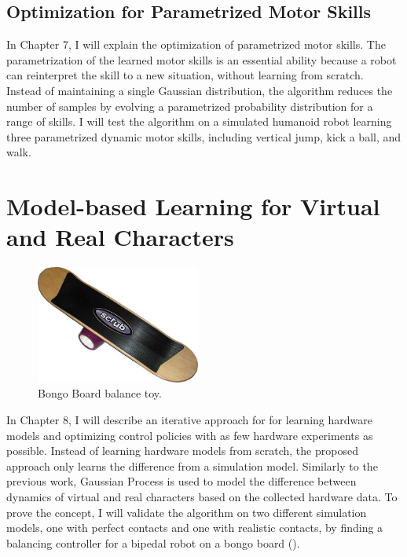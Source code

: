\subsection{Optimization for Parametrized Motor Skills}
In Chapter 7, I will explain the optimization of parametrized motor skills.
The parametrization of the learned motor skills is an essential ability
because a robot can reinterpret the skill to a new situation, without
learning from scratch.
Instead of maintaining a single Gaussian distribution, 
the algorithm reduces the number of samples by evolving a parametrized
probability distribution for a range of skills.
I will test the algorithm on a simulated humanoid
robot learning three parametrized dynamic motor skills, 
including vertical jump, kick a ball, and walk.

\section{Model-based Learning for Virtual and Real Characters}
\begin{figure}
 \vspace{-10pt}
  \begin{center}
    \includegraphics[width=0.48\textwidth]{images/intro_bongo.jpg}
  \end{center}
   \vspace{-25pt}
  \caption{Bongo Board balance toy.}
  \label{fig:intro_bongo}
   \vspace{-10pt}
\end{figure}
In Chapter 8, I will describe an iterative approach for for learning 
hardware models and optimizing control policies with 
as few hardware experiments as possible.
Instead of learning hardware models from scratch, the proposed approach only
learns the difference from a simulation model.
Similarly to the previous work, Gaussian Process is used to model 
the difference between dynamics of virtual and real characters
based on the collected hardware data.
To prove the concept, I will validate the algorithm on two different 
simulation models, one with perfect contacts and one with realistic contacts,
by finding a balancing controller for a bipedal robot on a bongo board
().

